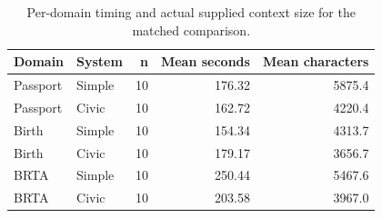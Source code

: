 \begin{table}[htbp]\centering\small
\caption{Per-domain timing and actual supplied context size for the matched comparison.}
\begin{tabularx}{\linewidth}{XXrrr}\toprule
Domain & System & n & Mean seconds & Mean characters\\\midrule
Passport & Simple & 10 & 176.32 & 5875.4\\
Passport & Civic & 10 & 162.72 & 4220.4\\
Birth & Simple & 10 & 154.34 & 4313.7\\
Birth & Civic & 10 & 179.17 & 3656.7\\
BRTA & Simple & 10 & 250.44 & 5467.6\\
BRTA & Civic & 10 & 203.58 & 3967.0\\
\bottomrule\end{tabularx}\end{table}

